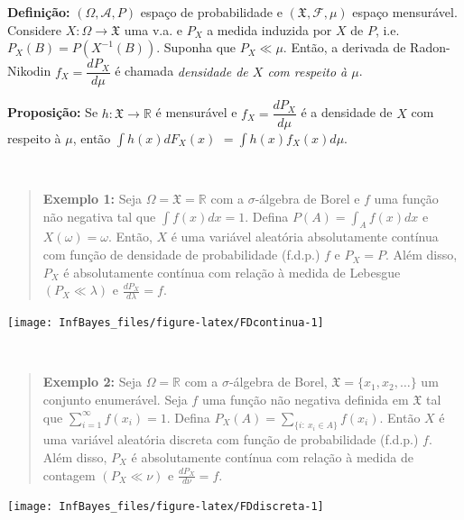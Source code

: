 \documentclass[
]{book}
\begin{document}
\(~\)

\(~\)

\textbf{Definição:} \((\Omega, \mathcal{A}, P)\) espaço de probabilidade e \((\mathfrak{X},\mathcal{F},\mu)\) espaço mensurável. Considere \(X: \Omega \longrightarrow \mathfrak{X}\) uma v.a. e \(P_X\) a medida induzida por \(X\) de \(P\), i.e.~\(P_X(B) = P(X^{-1}(B))\). Suponha que \(P_X \ll \mu\). Então, a derivada de Radon-Nikodin \(f_X = \dfrac{dP_X}{d\mu}\) é chamada \emph{densidade de \(X\) com respeito à \(\mu\)}.

\textbf{Proposição:} Se \(h: \mathfrak{X}\longrightarrow\mathbb{R}\) é mensurável e \(f_X = \dfrac{dP_X}{d\mu}\) é a densidade de \(X\) com respeito à \(\mu\), então \(\displaystyle\int h(x)dF_X(x)\) \(=\displaystyle\int h(x)f_X(x)d\mu\).

\(~\)

\begin{quote}
\textbf{Exemplo 1:} Seja \(\Omega=\mathfrak{X}=\mathbb{R}\) com a \(\sigma\)-álgebra de Borel e \(f\) uma função não negativa tal que \(\displaystyle\int f(x) dx = 1\). Defina \(\displaystyle P(A)= \int_A f(x) dx\) e \(X(\omega)=\omega\). Então, \(X\) é uma variável aleatória absolutamente contínua com função de densidade de probabilidade (f.d.p.) \(f\) e \(P_X = P\). Além disso, \(P_X\) é absolutamente contínua com relação à medida de Lebesgue \((P_X \ll \lambda)\) e \(\frac{dP_X}{d\lambda}=f\).
\end{quote}

\begin{center}\texttt{[image: InfBayes\_files/figure-latex/FDcontinua-1]} \end{center}

\(~\)

\begin{quote}
\textbf{Exemplo 2:} Seja \(\Omega=\mathbb{R}\) com a \(\sigma\)-álgebra de Borel, \(\mathfrak{X} = \{x_1,x_2,\ldots\}\) um conjunto enumerável. Seja \(f\) uma função não negativa definida em \(\mathfrak{X}\) tal que \(\displaystyle \sum_{i=1}^{\infty} f(x_i) = 1\). Defina \(\displaystyle P_X(A) = \sum_{\{i:~x_i \in A\}} f(x_i)\). Então \(X\) é uma variável aleatória discreta com função de probabilidade (f.d.p.) \(f\). Além disso, \(P_X\) é absolutamente contínua com relação à medida de contagem \((P_X \ll \nu)\) e \(\frac{dP_X}{d\nu}=f\).
\end{quote}

\begin{center}\texttt{[image: InfBayes\_files/figure-latex/FDdiscreta-1]} \end{center}
\end{document}
